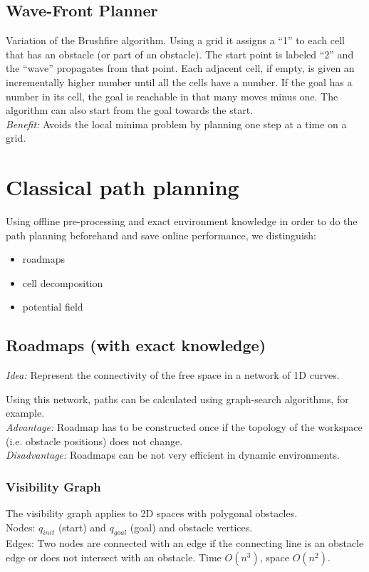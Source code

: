 \begin{multicols*}{2}
\subsection{Wave-Front Planner}
Variation of the Brushfire algorithm. Using a grid it assigns a “1” to each cell that has an obstacle (or part of an obstacle).
The start point is labeled “2” and the “wave” propagates from that point. Each adjacent cell, if empty, is given an incrementally higher number until all the cells have a number.
If the goal has a number in its cell, the goal is reachable in that many moves minus one.
The algorithm can also start from the goal towards the start.\\
\textit{Benefit:} Avoids the local minima problem by planning one step at a time on a grid.

\section{Classical path planning}
Using offline pre-processing and exact environment knowledge in order to do the path planning beforehand and save online performance, we distinguish:
\begin{itemize}
	\item roadmaps
	\item cell decomposition
	\item potential field
\end{itemize}

\subsection{Roadmaps (with exact knowledge)}
\textit{Idea:} Represent the connectivity of the free space in a network of 1D curves.\par
Using this network, paths can be calculated using graph-search algorithms, for example.\\ \textit{Advantage:} Roadmap has to be constructed once if the topology of the workspace (i.e. obstacle positions) does not change.\\
\textit{Disadvantage:} Roadmaps can be not very efficient in dynamic environments.

\subsubsection{Visibility Graph}
The visibility graph applies to 2D spaces with polygonal obstacles.\\
Nodes: $q_{init}$ (start) and $q_{goal}$ (goal) and obstacle vertices.\\
Edges: Two nodes are connected with an edge if the connecting line is an obstacle edge or does not intersect with an obstacle.
Time $O(n^3)$, space $O(n^2)$.


\end{multicols*}
